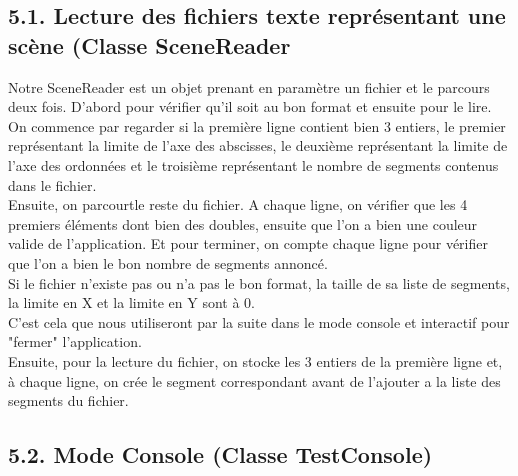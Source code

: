 \documentclass[a4paper,12pt]{report}	%
\begin{document}
	{\subsection*{5.1. Lecture des fichiers texte représentant une scène (Classe SceneReader}}
	   Notre SceneReader est un objet prenant en paramètre un fichier et le parcours deux fois. D'abord pour vérifier qu'il soit au bon format et ensuite pour le lire.\\
\indent On commence par regarder si la première ligne contient bien 3 entiers, le premier représentant la limite de l'axe des abscisses, le deuxième représentant la limite de l'axe des ordonnées et le troisième représentant le nombre de segments contenus dans le fichier. \\
\indent Ensuite, on parcourtle reste du fichier. A chaque ligne, on vérifier que les 4 premiers éléments dont bien des doubles, ensuite que l'on a bien une couleur valide de l'application. Et pour terminer, on compte chaque ligne pour vérifier que l'on a bien le bon nombre de segments annoncé. \\
Si le fichier n'existe pas ou n'a pas le bon format, la taille de sa liste de segments, la limite en X et la limite en Y sont à 0.\\
    C'est cela que nous utiliseront par la suite dans le mode console et interactif pour "fermer" l'application. \\

    Ensuite, pour la lecture du fichier, on stocke les 3 entiers de la première ligne et, à chaque ligne, on crée le segment correspondant avant de l'ajouter a la liste des segments du fichier. \\
	
	{\subsection*{5.2. Mode Console (Classe TestConsole)}}
	
\end{document}
